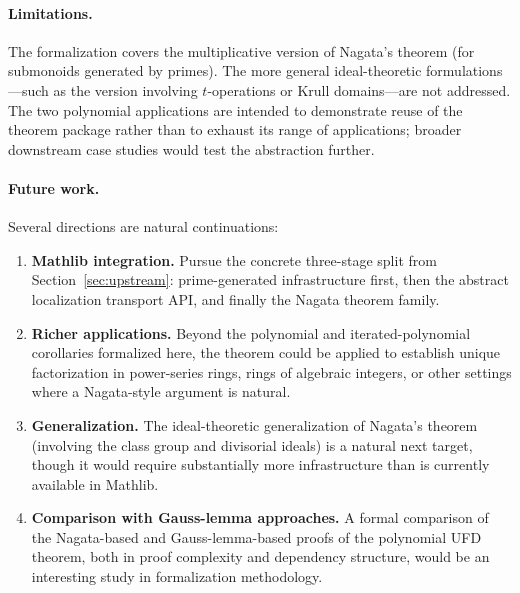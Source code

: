 \documentclass[11pt]{article}
\theoremstyle{plain}
\theoremstyle{definition}
\theoremstyle{remark}
\begin{document}
\paragraph{Limitations.}
The formalization covers the multiplicative version of Nagata's theorem (for
submonoids generated by primes).  The more general ideal-theoretic
formulations---such as the version involving $t$-operations or Krull
domains---are not addressed.  The two polynomial applications are intended to
demonstrate reuse of the theorem package rather than to exhaust its range of
applications; broader downstream case studies would test the abstraction
further.

\paragraph{Future work.}
Several directions are natural continuations:
\begin{enumerate}[nosep]
\item \textbf{Mathlib integration.}  Pursue the concrete three-stage split from
  Section~\ref{sec:upstream}: prime-generated infrastructure first, then the
  abstract localization transport API, and finally the Nagata theorem family.
  \item \textbf{Richer applications.}  Beyond the polynomial and iterated-polynomial
  corollaries formalized here, the theorem could be applied to establish unique
  factorization in power-series rings, rings of algebraic integers, or other
  settings where a Nagata-style argument is natural.
\item \textbf{Generalization.}  The ideal-theoretic generalization of Nagata's
  theorem (involving the class group and divisorial ideals) is a natural next
  target, though it would require substantially more infrastructure than is
  currently available in Mathlib.
\item \textbf{Comparison with Gauss-lemma approaches.}  A formal comparison of
  the Nagata-based and Gauss-lemma-based proofs of the polynomial UFD theorem,
  both in proof complexity and dependency structure, would be an interesting
  study in formalization methodology.
\end{enumerate}


\end{document}
